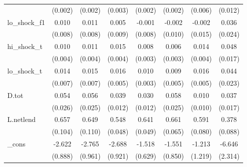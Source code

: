 {\begin{tabular}{l*{7}{c}}
            &     (0.002)         &     (0.002)         &     (0.003)         &     (0.002)         &     (0.002)         &     (0.006)         &     (0.012)         \\
\addlinespace
lo\_shock\_f1 &       0.010         &       0.011         &       0.005         &      -0.001         &      -0.002         &      -0.002         &       0.036         \\
            &     (0.008)         &     (0.008)         &     (0.009)         &     (0.008)         &     (0.010)         &     (0.015)         &     (0.024)         \\
\addlinespace
hi\_shock\_t  &       0.010\sym{**} &       0.011\sym{**} &       0.015\sym{***}&       0.008\sym{***}&       0.006\sym{*}  &       0.014\sym{***}&       0.048\sym{***}\\
            &     (0.004)         &     (0.004)         &     (0.004)         &     (0.003)         &     (0.003)         &     (0.004)         &     (0.017)         \\
\addlinespace
lo\_shock\_t  &       0.014\sym{*}  &       0.015\sym{*}  &       0.016\sym{***}&       0.010\sym{***}&       0.009\sym{*}  &       0.016\sym{***}&       0.044\sym{*}  \\
            &     (0.007)         &     (0.007)         &     (0.005)         &     (0.003)         &     (0.005)         &     (0.005)         &     (0.023)         \\
\addlinespace
D.tot       &       0.054\sym{**} &       0.056\sym{**} &       0.039\sym{***}&       0.030\sym{**} &       0.058\sym{**} &       0.010         &       0.037\sym{**} \\
            &     (0.026)         &     (0.025)         &     (0.012)         &     (0.012)         &     (0.025)         &     (0.010)         &     (0.017)         \\
\addlinespace
L.netlend   &       0.657\sym{***}&       0.649\sym{***}&       0.548\sym{***}&       0.641\sym{***}&       0.661\sym{***}&       0.591\sym{***}&       0.378\sym{***}\\
            &     (0.104)         &     (0.110)         &     (0.048)         &     (0.049)         &     (0.065)         &     (0.080)         &     (0.088)         \\
\addlinespace
\_cons      &      -2.622\sym{***}&      -2.765\sym{***}&      -2.688\sym{***}&      -1.518\sym{**} &      -1.551\sym{*}  &      -1.213         &      -6.646\sym{***}\\
            &     (0.888)         &     (0.961)         &     (0.921)         &     (0.629)         &     (0.850)         &     (1.219)         &     (2.314)         \\

\end{tabular}}
